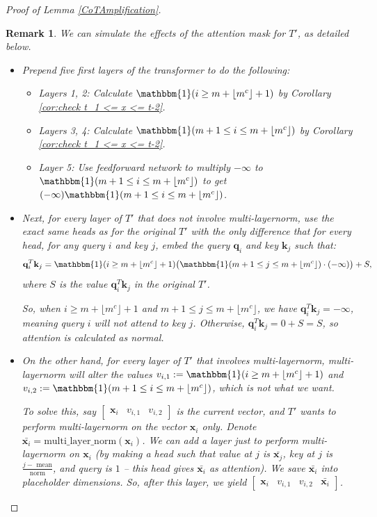 \documentclass{article}
\newtheorem{remark}[theorem]{Remark}
\theoremstyle{definition}
\newcommand{\x}{\mathbf{x}}
\newcommand{\q}{\mathbf{q}}
\renewcommand{\k}{\mathbf{k}}
\newcommand{\0}{\mathbf{0}}
\newcommand{\multilayernorm}{\text{multi\_layer\_norm}}
\newcommand{\1}{\mathbbm{1}}
\begin{document}
\begin{proof}[Proof of Lemma \ref{CoTAmplification}]
\begin{remark} \label{rmk:simulate attn mask}
    We can simulate the effects of the attention mask for $T'$, as detailed below. 
 	\begin{itemize}
 		\item Prepend five first layers of the transformer to do the following: 
 		\begin{itemize}
 			\item Layers 1, 2: Calculate $\1(i \geq m + \lfloor m^c\rfloor + 1)$ by Corollary \ref{cor:check t_1 <= x <= t-2}. 
 			\item Layers 3, 4: Calculate $\1(m+1 \leq i \leq m + \lfloor m^c\rfloor)$ by Corollary \ref{cor:check t_1 <= x <= t-2}. 
 			\item Layer 5: Use feedforward network to multiply $- \infty$ to $\1(m+1 \leq i \leq m + \lfloor m^c\rfloor)$ to get $(- \infty) \1(m+1 \leq i \leq m + \lfloor m^c\rfloor)$.  
 		\end{itemize}
 		\item Next, for every layer of $T'$ \textit{that does not involve multi-layernorm}, use the exact same heads as for the original $T'$ with the only difference that for every head, for any query $i$ and key $j$, embed the query $\q_i$ and key $\k_j$ such that: 
 		$$\q_i^T \k_j = \1(i \geq m + \lfloor m^c\rfloor + 1) \big(\1(m+1 \leq j \leq m + \lfloor m^c\rfloor) \cdot (-\infty)\big) + S,$$
        where $S$ is the value $\q_i^T \k_j$ in the original $T'$.
        
 		So, when $i \geq m + \lfloor m^c\rfloor + 1$ and $m+1 \leq j \leq m + \lfloor m^c\rfloor$, we have $\q_i^T \k_j = -\infty$, 
        meaning query $i$ will not attend to key $j$. Otherwise, $\q_i^T \k_j = 0 + S = S$, so attention is calculated as normal. 
 		
 		\item On the other hand, for every layer of $T'$ \textit{that involves multi-layernorm}, multi-layernorm will alter the values $v_{i,1} := \1(i \geq m + \lfloor m^c\rfloor + 1)$ and $v_{i,2} := \1(m+1 \leq i \leq m + \lfloor m^c\rfloor)$, which is not what we want.  
 		
 		To solve this, say $\begin{bmatrix}
 			\x_i &v_{i,1} &v_{i,2}
 		\end{bmatrix}$ is the current vector, and $T'$ wants to perform multi-layernorm on the vector $\x_i$ only. Denote $\bar{\x_i} = \multilayernorm(\x_i)$. We can add a layer just to perform multi-layernorm on $\x_i$ (by making a head such that value at $j$ is $\bar{\x_j}$, key at $j$ is $\frac{j - \text{ mean}}{\text{norm}}$, and query is $1$ -- this head gives $\bar{\x_i}$ as attention). We save $\bar{\x_i}$ into placeholder dimensions. So, after this layer, we yield $\begin{bmatrix}
	 		\x_i &v_{i,1} &v_{i,2} &\bar{\x_i}
	 	\end{bmatrix}$. 
 	

\end{itemize}
\end{remark}
\end{proof}
\end{document}
